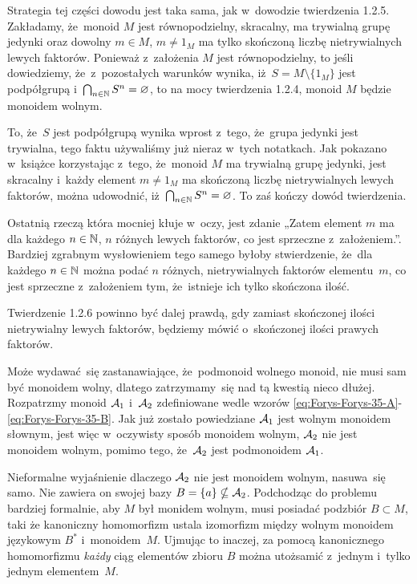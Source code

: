 \documentclass[a4paper,11pt]{article}
\begin{document}
Strategia tej części dowodu jest taka sama, jak w~dowodzie twierdzenia
1.2.5. Zakładamy, że~monoid $M$ jest równopodzielny, skracalny, ma
trywialną grupę jedynki oraz dowolny $m \in M$, $m \neq 1_{ M }$ ma
tylko skończoną liczbę nietrywialnych lewych faktorów. Ponieważ
z~założenia $M$ jest równopodzielny, to jeśli dowiedziemy,
że~z~pozostałych warunków wynika, iż~$S = M \setminus \{ 1_{ M } \}$
jest podpółgrupą i~$\bigcap_{ n \in \mathbb{N} } S^{ n } = \varnothing$, to na
mocy twierdzenia 1.2.4, monoid $M$ będzie monoidem wolnym.

To, że~$S$ jest podpółgrupą wynika wprost z~tego, że~grupa jedynki
jest trywialna, tego faktu używaliśmy już nieraz w~tych notatkach. Jak
pokazano w~książce korzystając z~tego, że~monoid $M$ ma trywialną
grupę jedynki, jest skracalny i~każdy element $m \neq 1_{ M }$ ma
skończoną liczbę nietrywialnych lewych faktorów, można udowodnić,
iż~$\bigcap_{ n \in \mathbb{N} } S^{ n } = \varnothing$. To zaś kończy dowód twierdzenia.

Ostatnią rzeczą która mocniej kłuje w~oczy, jest zdanie „Zatem element
$m$ ma dla każdego $n \in \mathbb{N}$, $n$ różnych lewych faktorów, co jest
sprzeczne z~założeniem.”. Bardziej zgrabnym wysłowieniem tego samego
byłoby stwierdzenie, że~dla każdego $n \in \mathbb{N}$ można podać $n$
różnych, nietrywialnych faktorów elementu~$m$, co jest sprzeczne
z~założeniem tym, że~istnieje ich tylko skończona ilość.

\vspace{\spaceFour}





 Twierdzenie 1.2.6 powinno być dalej prawdą, gdy zamiast skończonej
ilości nietrywialny lewych faktorów, będziemy mówić o~skończonej ilości
prawych faktorów.

\vspace{\spaceFour}





 Może wydawać~się zastanawiające, że~podmonoid wolnego
monoid, nie musi sam być monoidem wolny, dlatego zatrzymamy~się nad tą
kwestią nieco dłużej. Rozpatrzmy monoid $\mathcal{A}_{ 1 }$ i~$\mathcal{A}_{ 2 }$
zdefiniowane wedle wzorów
\eqref{eq:Forys-Forys-35-A}-\eqref{eq:Forys-Forys-35-B}. Jak już
zostało powiedziane $\mathcal{A}_{ 1 }$ jest wolnym monoidem słownym, jest
więc w~oczywisty sposób monoidem wolnym, $\mathcal{A}_{ 2 }$ nie jest
monoidem wolnym, pomimo tego, że~$\mathcal{A}_{ 2 }$ jest podmonoidem
$\mathcal{A}_{ 1 }$.

Nieformalne wyjaśnienie dlaczego $\mathcal{A}_{ 2 }$ nie jest monoidem
wolnym, nasuwa~się samo. Nie zawiera on swojej bazy
$B = \{ a \} \nsubseteq \mathcal{A}_{ 2 }$. Podchodząc do problemu bardziej
formalnie, aby $M$ był monidem wolnym, musi posiadać podzbiór
$B \subset M$, taki że kanoniczny homomorfizm ustala izomorfizm między
wolnym monoidem językowym $B^{ * }$ i~monoidem~$M$. Ujmując to
inaczej, za pomocą kanonicznego homomorfizmu \textit{każdy} ciąg
elementów zbioru $B$ można utożsamić z~jednym i~tylko jednym
elementem~$M$.
\end{document}
